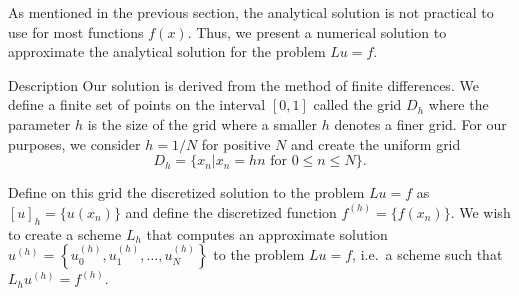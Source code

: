 As mentioned in the previous section, the analytical solution is not practical
to use for most functions $f(x)$. Thus, we present a numerical solution to
approximate the analytical solution for the problem $Lu = f$.

\begin{subsection}{Description}
  Our solution is derived from the method of finite differences. We define
  a finite set of points on the interval $[0, 1]$ called the grid $D_h$ where
  the parameter $h$ is the size of the grid where a smaller $h$ denotes a finer
  grid. For our purposes, we consider $h=1/N$ for positive $N$ and
  create the uniform grid
  \[
  D_h = \{x_n| x_n = hn \text{ for $0 \leq n \leq N$}\}.
  \]

  Define on this grid the discretized solution to the problem $Lu = f$ as
  $[u]_h = \{u(x_n)\}$ and define the discretized function $f^{(h)} = \{f(x_n)\}$.
  We wish to create a scheme $L_h$ that computes an approximate solution
  $u^{(h)} = \left\{u_0^{(h)}, u_1^{(h)}, \dots, u_N^{(h)}\right\}$ to the problem
  $Lu = f$, i.e.\ a scheme such that $L_h u^{(h)} = f^{(h)}$.


\end{subsection}

